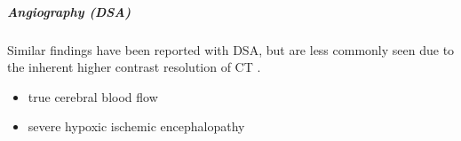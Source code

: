 \subparagraph{Angiography (DSA)}

Similar findings have been reported with DSA, but are less commonly seen due to the inherent higher contrast resolution of CT .

\begin{tcolorbox}[colback=green!5!white,colframe=green!75!white,title=Differential diagnosis]
	\begin{itemize}
		\item
		true cerebral blood flow
		\item
		severe hypoxic ischemic encephalopathy
	\end{itemize}
\end{tcolorbox}